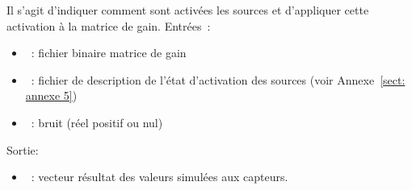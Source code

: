 Il s'agit d'indiquer comment sont activées les sources et d'appliquer cette activation à la matrice de gain. 
Entrées~: 
\begin{itemize}
    \item {}~: fichier binaire matrice de gain
    \item {}~: fichier de description de l'état d'activation des sources (voir Annexe~\ref{sect: annexe 5})
    \item {}~: bruit (réel positif ou nul)
\end{itemize}
Sortie:
\begin{itemize}
    \item {}~: vecteur résultat des valeurs simulées aux capteurs.
\end{itemize}

\medskip

\noindent
{}
